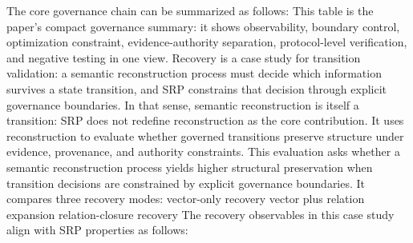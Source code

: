{}The core governance chain can be summarized as follows:\markdownRendererInterblockSeparator
{}\markdownRendererInterblockSeparator
{}This table is the paper's compact governance summary: it shows observability, boundary control, optimization constraint, evidence-authority separation, protocol-level verification, and negative testing in one view.\markdownRendererInterblockSeparator
{}
\markdownRendererSectionEnd \markdownRendererSectionBegin
{}\markdownRendererInterblockSeparator
{}\markdownRendererSectionBegin
{}\markdownRendererInterblockSeparator
{}Recovery is a case study for transition validation: a semantic reconstruction process must decide which information survives a state transition, and SRP constrains that decision through explicit governance boundaries.\markdownRendererParagraphSeparator
{}In that sense, semantic reconstruction is itself a transition:\markdownRendererInterblockSeparator
{}\markdownRendererInterblockSeparator
{}SRP does not redefine reconstruction as the core contribution. It uses reconstruction to evaluate whether governed transitions preserve structure under evidence, provenance, and authority constraints.\markdownRendererInterblockSeparator
{}
\markdownRendererSectionEnd \markdownRendererSectionBegin
{}\markdownRendererInterblockSeparator
{}This evaluation asks whether a semantic reconstruction process yields higher structural preservation when transition decisions are constrained by explicit governance boundaries.\markdownRendererParagraphSeparator
{}It compares three recovery modes:\markdownRendererInterblockSeparator
{}\markdownRendererUlBeginTight
\markdownRendererUlItem vector-only recovery\markdownRendererUlItemEnd 
\markdownRendererUlItem vector plus relation expansion\markdownRendererUlItemEnd 
\markdownRendererUlItem relation-closure recovery\markdownRendererUlItemEnd 
\markdownRendererUlEndTight \markdownRendererInterblockSeparator
{}The recovery observables in this case study align with SRP properties as follows:\markdownRendererInterblockSeparator
{}\markdownRendererInterblockSeparator
